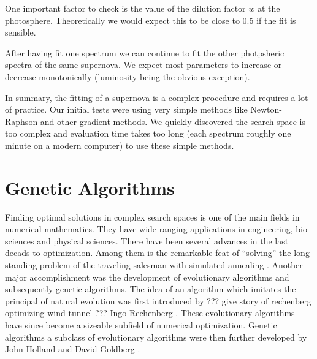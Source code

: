 One important factor to check is the value of the dilution factor $w$ at the photosphere. Theoretically we would expect this to be close to 0.5 if the fit is sensible. 

After having fit one spectrum we can continue to fit the other photpsheric spectra of the same supernova. We expect most parameters to increase or decrease monotonically (luminosity being the obvious exception). 

In summary, the fitting of a supernova is a complex procedure and requires a lot of practice. Our initial tests were using very simple methods like Newton-Raphson and other gradient methods. We quickly discovered the search space is too complex and evaluation time takes too long (each spectrum roughly one minute on a modern computer) to use these simple methods. 

 
\section{Genetic Algorithms}

Finding optimal solutions in complex search spaces is one of the main fields in numerical mathematics.  They have wide ranging applications in engineering, bio sciences and physical sciences. There have been several advances in the last decads to optimization. 
Among them is the  remarkable feat of ``solving'' the long-standing problem of the traveling salesman with simulated annealing \citep{Kirkpatrick13051983}.
Another major accomplishment was the development of evolutionary algorithms and subsequently genetic algorithms. The idea of an algorithm which imitates the principal of natural evolution was first introduced by ??? give story of rechenberg optimizing wind tunnel ??? Ingo Rechenberg \citep{Rechenberg1973}. These evolutionary algorithms have since become a sizeable subfield of numerical optimization. Genetic algorithms a subclass of evolutionary algorithms were then further developed by John Holland and David Goldberg \citep{citeulike:125978}.

